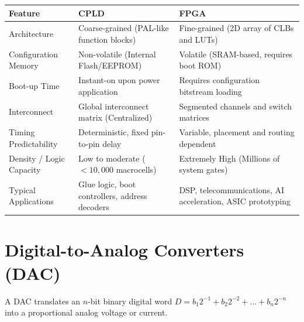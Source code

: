 \documentclass[12pt,a4paper]{article}
\begin{document}
\par\vspace{6pt}\noindent
\begingroup
\setlength{\tabcolsep}{3.5pt}
\setlength{\extrarowheight}{3pt}
\begin{tabularx}{\linewidth}{|B{2.8cm}|Y|Y|}
\hline
\textbf{Feature} & \textbf{CPLD} & \textbf{FPGA} \\
\hline
Architecture & Coarse-grained (PAL-like function blocks) & Fine-grained (2D array of CLBs and LUTs) \\
\hline
Configuration Memory & Non-volatile (Internal Flash/EEPROM) & Volatile (SRAM-based, requires boot ROM) \\
\hline
Boot-up Time & Instant-on upon power application & Requires configuration bitstream loading \\
\hline
Interconnect & Global interconnect matrix (Centralized) & Segmented channels and switch matrices \\
\hline
Timing Predictability & Deterministic, fixed pin-to-pin delay & Variable, placement and routing dependent \\
\hline
Density / Logic Capacity & Low to moderate ($< 10{,}000$ macrocells) & Extremely High (Millions of system gates) \\
\hline
Typical Applications & Glue logic, boot controllers, address decoders & DSP, telecommunications, AI acceleration, ASIC prototyping \\
\hline
\end{tabularx}
\endgroup

\section{Digital-to-Analog Converters (DAC)}

A DAC translates an $n$-bit binary digital word $D = b_1 2^{-1} + b_2 2^{-2} + \dots + b_n 2^{-n}$ into a proportional analog voltage or current.
\end{document}

